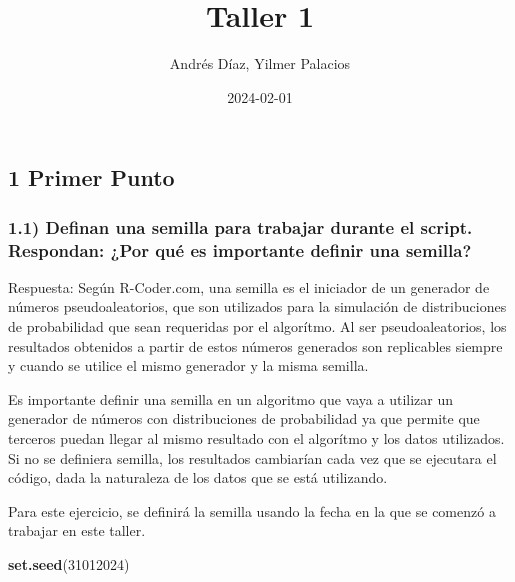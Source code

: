 \documentclass[
]{article}
\title{Taller 1}
\author{Andrés Díaz, Yilmer Palacios}
\date{2024-02-01}
\newenvironment{Shaded}{\begin{snugshade}}{\end{snugshade}}
\newcommand{\DecValTok}[1]{\textcolor[rgb]{0.00,0.00,0.81}{#1}}
\newcommand{\FunctionTok}[1]{\textcolor[rgb]{0.13,0.29,0.53}{\textbf{#1}}}
\newcommand{\NormalTok}[1]{#1}
\begin{document}
\maketitle

\hypertarget{primer-punto}{%
\subsection{1 Primer Punto}\label{primer-punto}}

\hypertarget{definan-una-semilla-para-trabajar-durante-el-script.-respondan-por-quuxe9-es-importante-definir-una-semilla}{%
\subsubsection{1.1) Definan una semilla para trabajar durante el script.
Respondan: ¿Por qué es importante definir una
semilla?}\label{definan-una-semilla-para-trabajar-durante-el-script.-respondan-por-quuxe9-es-importante-definir-una-semilla}}

Respuesta: Según R-Coder.com, una semilla es el iniciador de un
generador de números pseudoaleatorios, que son utilizados para la
simulación de distribuciones de probabilidad que sean requeridas por el
algorítmo. Al ser pseudoaleatorios, los resultados obtenidos a partir de
estos números generados son replicables siempre y cuando se utilice el
mismo generador y la misma semilla.

Es importante definir una semilla en un algoritmo que vaya a utilizar un
generador de números con distribuciones de probabilidad ya que permite
que terceros puedan llegar al mismo resultado con el algorítmo y los
datos utilizados. Si no se definiera semilla, los resultados cambiarían
cada vez que se ejecutara el código, dada la naturaleza de los datos que
se está utilizando.

Para este ejercicio, se definirá la semilla usando la fecha en la que se
comenzó a trabajar en este taller.

\begin{Shaded}
\begin{Highlighting}[]
\FunctionTok{set.seed}\NormalTok{(}\DecValTok{31012024}\NormalTok{)}
\end{Highlighting}
\end{Shaded}
\end{document}
